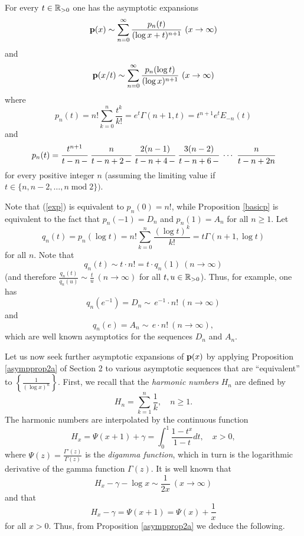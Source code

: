 \documentclass[12pt]{article}
\begin{document}
\begin{proposition}
For every $t \in {\mathbb R}_{> 0}$ one has the asymptotic expansions
$${\mathbf p}(x) \sim \sum_{n=0}^\infty \frac{p_n(t)}{(\log x+t)^{n+1}} \ (x \to \infty)$$
and
$${\mathbf p}(x/t) \sim \sum_{n=0}^\infty \frac{p_n(\log t)}{(\log x)^{n+1}} \ (x \to \infty)$$
where $$p_n(t) =n! \sum_{k = 0}^n \frac{t^k}{k!}  = e^t \Gamma(n+1,t) = t^{n+1} e^t E_{-n}(t)$$
and
$$p_n(t) =   \cfrac{t^{n+1}}{t -n \, -} \  \cfrac{n}{t - n + 2 \,-}\  \cfrac{2(n-1)}{t-n+4 \,-}\  \cfrac{3(n-2)}{t-n+6 \, - } \ \cdots \ \cfrac{n}{t-n+2n} $$ for every positive integer $n$ (assuming the limiting value if $t \in \{n,n-2,\ldots, n \operatorname{mod} 2\})$.
\end{proposition}

Note that (\ref{exp}) is equivalent to $p_n(0) = n!$, while Proposition \ref{basicp} is equivalent to the fact that $p_n(-1) = D_{n}$ and $p_n(1) = A_{n}$ for all $n \geq 1$.    Let 
$$q_n(t) =  p_n(\log t) =n! \sum_{k = 0}^n \frac{(\log t)^k}{k!} = t\Gamma(n+1,\log t)$$
for all $n$.  Note that
$$q_n(t) \sim   t \cdot n! = t \cdot q_n(1)  \ (n \to \infty)$$
(and therefore $\frac{q_n(t)}{q_n(u)} \sim \frac{t}{u} \ (n \to \infty)$ for all $t, u \in {\mathbb R}_{> 0}$).  Thus, for example, one has
$$q_{n}(e^{-1}) = D_{n} \sim \, e^{-1} \cdot n! \ (n \to \infty)$$
and
$$q_{n}(e) = A_{n} \sim \, e \cdot n! \ (n \to \infty),$$
which are well known asymptotics for the sequences $D_n$ and $A_n$.  


Let us now seek further asymptotic expansions of ${\mathbf p}(x)$ by applying Proposition \ref{asympprop2a} of Section 2 to various asymptotic sequences that are ``equivalent'' to $\left\{ \frac{1}{(\log x)^n}\right\}$.    First, we recall that the {\it harmonic numbers} $H_n$ are defined by $$H_n = \sum_{k = 1}^n \frac{1}{k}, \quad n \geq 1.$$  The harmonic numbers are interpolated by the continuous function
$$H_x = \Psi(x+1)+ \gamma =  \int_0^1 \frac{1-t^x}{1-t} dt, \quad x>0,$$
where $\Psi(z) = \frac{\Gamma'(z)}{\Gamma(z)}$ is the {\it digamma function}, which  in turn is the logarithmic derivative of the gamma function $\Gamma(z)$.  It is well known that
$$H_x -\gamma -\log x \sim \frac{1}{2x} \ (x \to \infty)$$  and that
 $$H_x - \gamma = \Psi(x+1) = \Psi(x) + \frac{1}{x}$$ for all $x >0$.
Thus, from Proposition \ref{asympprop2a}  we deduce
the following.  
\end{document}
